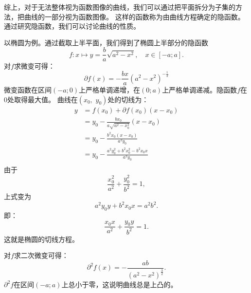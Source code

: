\documentclass[12pt,UTF8]{ctexbook}
\theoremstyle{definition}
\theoremstyle{plain}
\newtheorem{sk}{思考}[section]
\newtheorem{xt}{习题}[section]
\begin{document}
综上，对于无法整体视为函数图像的曲线，我们可以通过把平面拆分为子集的方法，把曲线的一部分视为函数图像。
这样的函数称为由曲线方程确定的隐函数。通过研究隐函数，我们可以讨论曲线的性质。

以椭圆为例。通过截取上半平面，我们得到了椭圆上半部分的隐函数
$$ f: x\mapsto y = \frac{b}{a}\sqrt{a^2 - x^2}, \quad x \in [-a; a].  $$
对$f$求微变可得：
$$ \partial f(x) = -\frac{bx}{a}(a^2 - x^2)^{-\frac{1}{2}}$$
微变函数在区间$(-a;0)$上严格单调递增，在$(0;a)$上严格单调递减。隐函数$f$在$0$处取得最大值。
曲线在$(x_0,\,\, y_0)$处的切线为：
\begin{align*}
    y &= f(x_0) + \partial f(x_0)(x - x_0) \\
    &= y_0 -\frac{bx_0}{a\sqrt{a^2 - x_0^2}}(x - x_0) \\
    &= y_0 - \frac{b^2x_0(x - x_0)}{a^2y_0} \\
    &= y_0 - \frac{a^2y_0^2 + b^2x_0^2 - b^2x_0x}{a^2y_0} \\
\end{align*}
由于
$$ \frac{x_0^2}{a^2} + \frac{y_0^2}{b^2} = 1,$$
上式变为
$$ a^2y_0y +  b^2x_0x = a^2b^2. $$
即：
$$ \frac{x_0x}{a^2} + \frac{y_0y}{b^2} = 1.$$
这就是椭圆的切线方程。

对$f$求二次微变可得：
$$ \partial^2 f(x) = -\frac{ab}{(a^2 - x^2)^{\frac{3}{2}} }.$$
$\partial^2 f$在区间$(-a;a)$上总小于零，这说明曲线总是上凸的。





\end{document}
